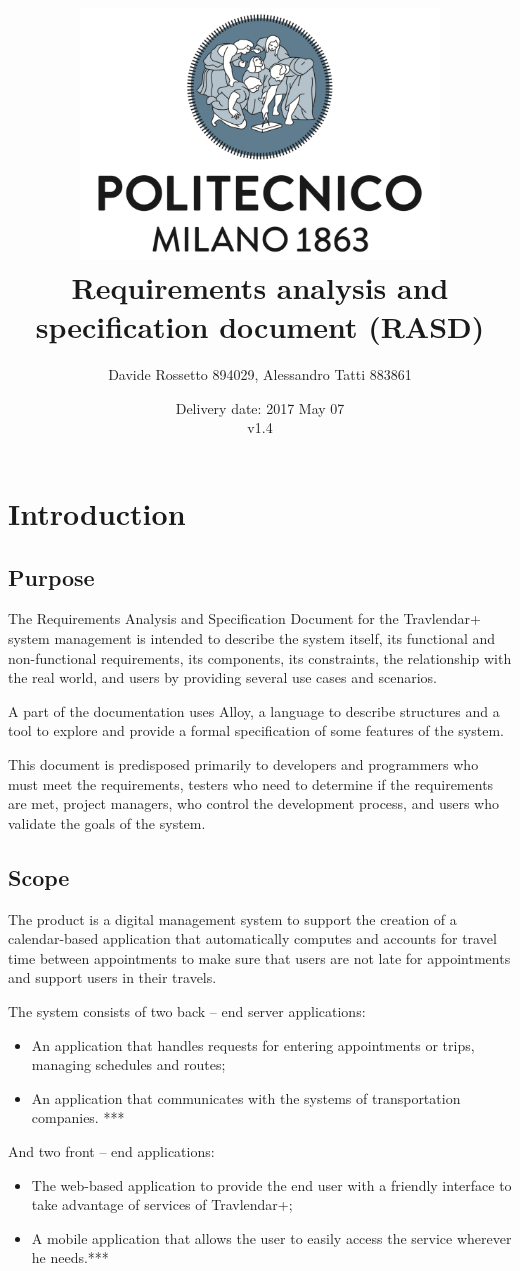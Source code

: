 \documentclass{article}
\title{ 
	\includegraphics[width=95mm]{img/PolimiLogo.png} \\
	\bigskip
	Requirements analysis and specification document (RASD)
}
\author{
	Davide Rossetto 894029, Alessandro Tatti 883861
}
\date{
	Delivery date: 2017 May 07\\
	\bigskip v1.4
}
\begin{document}
	
\maketitle
\newpage
\tableofcontents
\newpage
	
	
	\section{Introduction}
	
	
	\subsection{Purpose}
	The Requirements Analysis and Specification Document for the Travlendar+ system management is intended to describe the system itself, its functional and non-functional requirements, its components, its constraints, the relationship with the real world, and users by providing several use cases and scenarios.
	
	A part of the documentation uses Alloy, a language to describe structures and a tool to explore and provide a formal specification of some features of the system.
	
	\bigskip
	This document is predisposed primarily to developers and programmers who must meet the requirements, testers who need to determine if the requirements are met, project managers, who control the development process, and users who validate the goals of the system.
	
	
	\subsection{Scope}
	The product is a digital management system to support the creation of a calendar-based application that automatically computes and accounts for travel time between appointments to make sure that users are not late for appointments and support users in their travels.

	\bigskip
	The system consists of two back -- end server applications:
	\begin{itemize}
		\item An application that handles requests for entering appointments or trips, managing schedules and routes;
		\item An application that communicates with the systems of transportation companies. ***
	\end{itemize}

	\bigskip
	And two front -- end applications:
	\begin{itemize}
		\item The web-based application to provide the end user with a friendly interface to take advantage of services of Travlendar+;
		\item A mobile application that allows the user to easily access the service wherever he needs.***
	\end{itemize}
\end{document}
